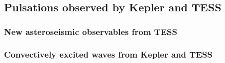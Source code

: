 {\color{blue}
\subsection{Pulsations observed by Kepler and TESS}


\subsubsection{New asteroseismic observables from TESS}

\subsubsection{Convectively excited waves from Kepler and TESS}


}